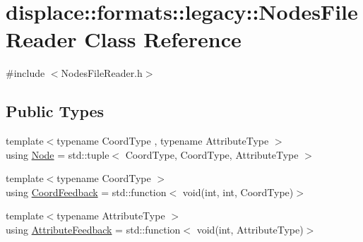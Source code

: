 \hypertarget{classdisplace_1_1formats_1_1legacy_1_1_nodes_file_reader}{}\section{displace\+::formats\+::legacy\+::Nodes\+File\+Reader Class Reference}
\label{classdisplace_1_1formats_1_1legacy_1_1_nodes_file_reader}


{\ttfamily \#include $<$Nodes\+File\+Reader.\+h$>$}

\subsection*{Public Types}
\begin{DoxyCompactItemize}
\item 
{\footnotesize template$<$typename Coord\+Type , typename Attribute\+Type $>$ }\\using \mbox{\hyperlink{classdisplace_1_1formats_1_1legacy_1_1_nodes_file_reader_a366283f07d187605ddd50f9ca7f9872a}{Node}} = std\+::tuple$<$ Coord\+Type, Coord\+Type, Attribute\+Type $>$
\item 
{\footnotesize template$<$typename Coord\+Type $>$ }\\using \mbox{\hyperlink{classdisplace_1_1formats_1_1legacy_1_1_nodes_file_reader_afafb20437b7e3bf2a9b6c63c3eb030e3}{Coord\+Feedback}} = std\+::function$<$ void(int, int, Coord\+Type)$>$
\item 
{\footnotesize template$<$typename Attribute\+Type $>$ }\\using \mbox{\hyperlink{classdisplace_1_1formats_1_1legacy_1_1_nodes_file_reader_aaace2a27c97ca3c31e9a177d4776afc8}{Attribute\+Feedback}} = std\+::function$<$ void(int, Attribute\+Type)$>$
\end{DoxyCompactItemize}
